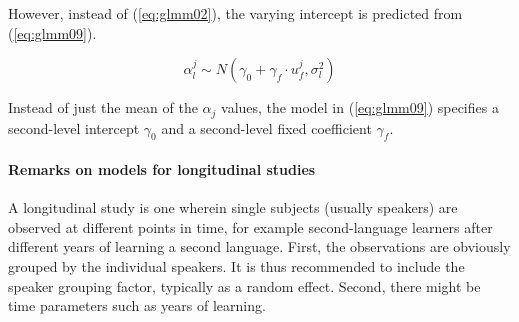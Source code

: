 \documentclass[a4paper,12pt]{article}
\begin{document}
However, instead of (\ref{eq:glmm02}), the varying intercept is predicted from (\ref{eq:glmm09}).

\begin{equation}
  \alpha_l^j\sim N(\gamma_0+\gamma_f\cdot u_f^j,\sigma_l^2)
  \label{eq:glmm09}
\end{equation}

Instead of just the mean of the $\alpha_j$ values, the model in (\ref{eq:glmm09}) specifies a second-level intercept $\gamma_0$ and a second-level fixed coefficient $\gamma_f$.

%  

\paragraph{Remarks on models for longitudinal studies}

A longitudinal study is one wherein single subjects (usually speakers) are observed at different points in time, for example second-language learners after different years of learning a second language.
First, the observations are obviously grouped by the individual speakers.
It is thus recommended to include the speaker grouping factor, typically as a random effect.
Second, there might be time parameters such as years of learning.
\end{document}
